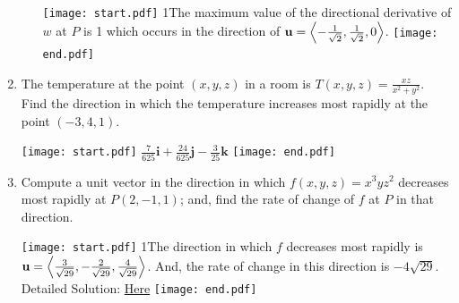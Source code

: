 \documentclass[12pt]{article}
\begin{document}
\begin{enumerate}
\begin{enumerate}
\texttt{[image: start.pdf]}
{{{1\linewidth}{The maximum value of the directional derivative of $w$ at $P$ is 1 which occurs in the direction of ${\bf u}=\left\langle -\frac{1}{\sqrt{2}}, \frac{1}{\sqrt{2}},0\right\rangle$.}}}
\texttt{[image: end.pdf]}


\end{enumerate}

\item The temperature at the point $(x,y,z)$ in a room is $T(x,y,z)=\frac{xz}{x^2+y^2}$. Find the direction in which the temperature increases most rapidly at the point $(-3, 4,1)$.  

\texttt{[image: start.pdf]}
{{$\frac{7}{625}\mathbf{i}+\frac{24}{625}\mathbf{j}-\frac{3}{25}\mathbf{k}$}}
\texttt{[image: end.pdf]}


\item Compute a unit vector in the direction in which $f(x,y,z)=x^3yz^2$ decreases most rapidly at $P(2, -1, 1)$; and, find the rate of change of $f$ at $P$ in that direction.

\texttt{[image: start.pdf]}
{{{1\linewidth}{The direction in which $f$ decreases most rapidly is ${\bf u}=\left\langle \frac{3}{\sqrt{29}},-\frac{2}{\sqrt{29}}, \frac{4}{\sqrt{29}}\right\rangle$.  And, the rate of change in this direction is $-4\sqrt{29}$.  Detailed Solution: \textcolor{blue}{\href{http://www.math.drexel.edu/classes/Calculus/resources/Math200HW/Solutions/12_200_Gradient_14.pdf}{Here}}}}}
\texttt{[image: end.pdf]}


\end{enumerate}

\end{document}
